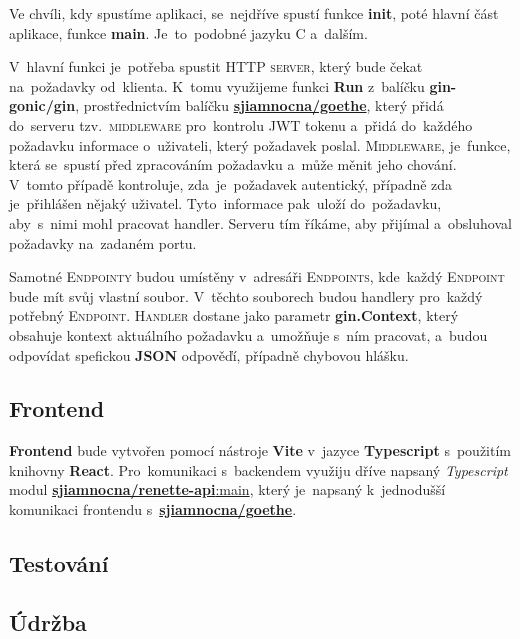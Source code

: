\documentclass[14pt,a4paper]{article}
\begin{document}
            Ve chvíli, kdy spustíme aplikaci, se~nejdříve spustí funkce \textbf{init}, poté hlavní část aplikace, funkce \textbf{main}. Je~to~podobné jazyku C a~dalším.

            V~hlavní funkci je~potřeba spustit \textsc{HTTP server}, který bude čekat na~požadavky od~klienta. K~tomu využijeme funkci \textbf{Run} z~balíčku \textbf{gin-gonic/gin}, prostřednictvím balíčku \href{https://gitlab.com/sjiamnocna/goethe}{\textbf{sjiamnocna/goethe}}, který přidá do~serveru tzv.~\textsc{middleware} pro~kontrolu \textsc{JWT} tokenu a~přidá do~každého požadavku informace o~uživateli, který požadavek poslal. \textsc{Middleware}, je~funkce, která se~spustí před zpracováním požadavku a~může měnit jeho chování. V~tomto případě kontroluje, zda~je~požadavek autentický, případně zda je~přihlášen nějaký uživatel. Tyto~informace pak~uloží do~požadavku, aby~s~nimi mohl pracovat handler. Serveru tím říkáme, aby přijímal a~obsluhoval požadavky na~zadaném portu.
            

            Samotné \textsc{Endpointy} budou umístěny v~adresáři \textsc{Endpoints}, kde~každý \textsc{Endpoint} bude mít svůj vlastní soubor. V~těchto souborech budou handlery pro~každý potřebný \textsc{Endpoint}. \textsc{Handler} dostane jako parametr \textbf{gin.Context}, který obsahuje kontext aktuálního požadavku a~umožňuje s~ním pracovat, a~budou odpovídat spefickou \textbf{JSON} odpověďí, případně chybovou hlášku.

        \subsection{Frontend}
            \textbf{Frontend} bude vytvořen pomocí nástroje \textbf{Vite} v~jazyce \textbf{Typescript} s~použitím knihovny \textbf{React}. Pro~komunikaci s~backendem využiju dříve napsaný \emph{Typescript} modul \href{https://gitlab.com/sjiamnocna/renette-api}{\textbf{sjiamnocna/renette-api}:main}, který je~napsaný k~jednodušší komunikaci frontendu s~\href{https://gitlab.com/sjiamnocna/goethe}{\textbf{sjiamnocna/goethe}}.
        \subsection{Testování}
        \subsection{Údržba}
        
\end{document}
